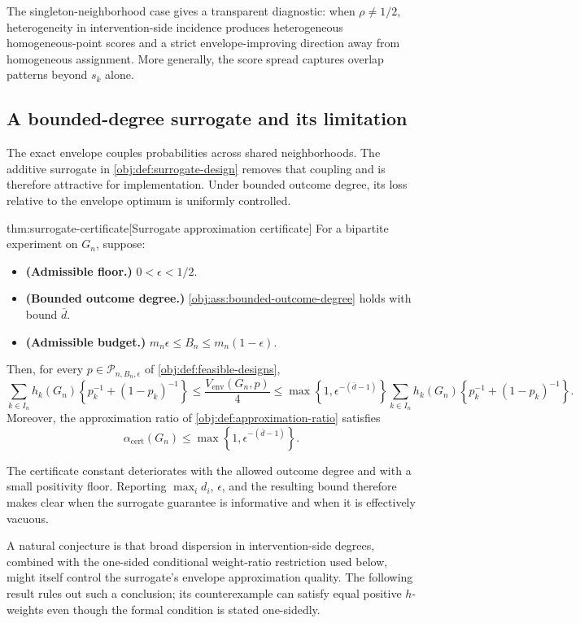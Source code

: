 \documentclass[11pt]{article}
\begin{document}
The singleton-neighborhood case gives a transparent diagnostic: when \(\rho\neq 1/2\), heterogeneity in intervention-side incidence produces heterogeneous homogeneous-point scores and a strict envelope-improving direction away from homogeneous assignment. More generally, the score spread captures overlap patterns beyond \(s_k\) alone.

\subsection{A bounded-degree surrogate and its limitation}

The exact envelope couples probabilities across shared neighborhoods. The additive surrogate in \cref{obj:def:surrogate-design} removes that coupling and is therefore attractive for implementation. Under bounded outcome degree, its loss relative to the envelope optimum is uniformly controlled.

\begin{theoremv}{thm:surrogate-certificate}[Surrogate approximation certificate]
For a bipartite experiment on \(G_n\), suppose:
\begin{itemize}
\item \textbf{(Admissible floor.)} \(0<\epsilon<1/2\).
\item \textbf{(Bounded outcome degree.)} \cref{obj:ass:bounded-outcome-degree} holds with bound \(\bar d\).
\item \textbf{(Admissible budget.)} \(m_n\epsilon\le B_n\le m_n(1-\epsilon)\).
\end{itemize}
Then, for every \(p\in\mathcal P_{n,B_n,\epsilon}\) of \cref{obj:def:feasible-designs},
\[
\sum_{k\in I_n}h_k(G_n)\!\left\{p_k^{-1}+(1-p_k)^{-1}\right\}
\le \frac{V_{\mathrm{env}}(G_n,p)}{4}
\le
\max\!\left\{1,\epsilon^{-(\bar d-1)}\right\}
\sum_{k\in I_n}h_k(G_n)\!\left\{p_k^{-1}+(1-p_k)^{-1}\right\}.
\]
Moreover, the approximation ratio of \cref{obj:def:approximation-ratio} satisfies
\[
\alpha_{\mathrm{cert}}(G_n)\le
\max\!\left\{1,\epsilon^{-(\bar d-1)}\right\}.
\]
\end{theoremv}

The certificate constant deteriorates with the allowed outcome degree and with a small positivity floor. Reporting \(\max_i d_i\), \(\epsilon\), and the resulting bound therefore makes clear when the surrogate guarantee is informative and when it is effectively vacuous.

A natural conjecture is that broad dispersion in intervention-side degrees, combined with the one-sided conditional weight-ratio restriction used below, might itself control the surrogate's envelope approximation quality. The following result rules out such a conclusion; its counterexample can satisfy equal positive \(h\)-weights even though the formal condition is stated one-sidedly.
\end{document}
